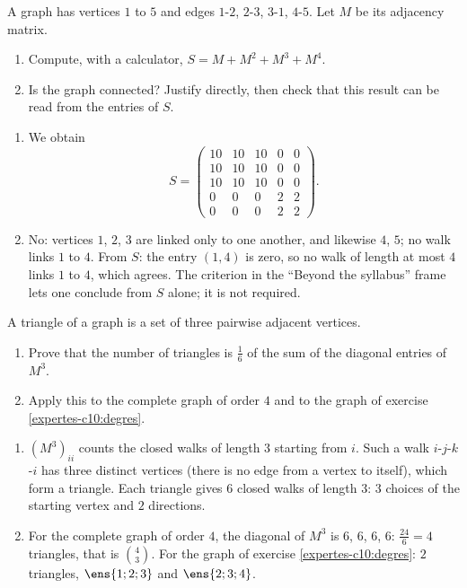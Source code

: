 \begin{exercise}
A graph has vertices $1$ to $5$ and edges $1$-$2$, $2$-$3$, $3$-$1$, $4$-$5$. Let $M$ be its adjacency matrix.
\begin{enumerate}
\item Compute, with a calculator, $S=M+M^2+M^3+M^4$.
\item Is the graph connected? Justify directly, then check that this result can be read from the entries of $S$.
\end{enumerate}
\end{exercise}
\begin{solution}
\begin{enumerate}
\item We obtain \[S=\begin{pmatrix}10&10&10&0&0\\10&10&10&0&0\\10&10&10&0&0\\0&0&0&2&2\\0&0&0&2&2\end{pmatrix}.\]
\item No: vertices $1$, $2$, $3$ are linked only to one another, and likewise $4$, $5$; no walk links $1$ to $4$. From $S$: the entry $(1,4)$ is zero, so no walk of length at most $4$ links $1$ to $4$, which agrees. The criterion in the ``Beyond the syllabus'' frame lets one conclude from $S$ alone; it is not required.
\end{enumerate}
\end{solution}

\begin{exercise}
A triangle of a graph is a set of three pairwise adjacent vertices.
\begin{enumerate}
\item Prove that the number of triangles is $\frac16$ of the sum of the diagonal entries of $M^3$.
\item Apply this to the complete graph of order $4$ and to the graph of exercise \ref{expertes-c10:degres}.
\end{enumerate}
\end{exercise}
\begin{solution}
\begin{enumerate}
\item $\left(M^3\right)_{ii}$ counts the closed walks of length $3$ starting from $i$. Such a walk $i$-$j$-$k$-$i$ has three distinct vertices (there is no edge from a vertex to itself), which form a triangle. Each triangle gives $6$ closed walks of length $3$: $3$ choices of the starting vertex and $2$ directions.
\item For the complete graph of order $4$, the diagonal of $M^3$ is $6$, $6$, $6$, $6$: $\frac{24}6=4$ triangles, that is $\binom43$. For the graph of exercise \ref{expertes-c10:degres}: $2$ triangles, $\ens{1;2;3}$ and $\ens{2;3;4}$.
\end{enumerate}
\end{solution}

